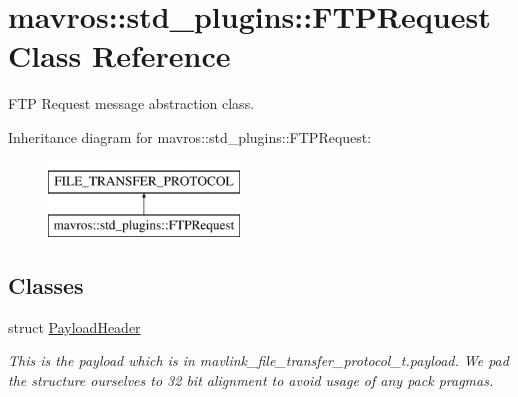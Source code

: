 \hypertarget{classmavros_1_1std__plugins_1_1FTPRequest}{}\section{mavros\+::std\+\_\+plugins\+::F\+T\+P\+Request Class Reference}
\label{classmavros_1_1std__plugins_1_1FTPRequest}


F\+TP Request message abstraction class.  


Inheritance diagram for mavros\+::std\+\_\+plugins\+::F\+T\+P\+Request\+:\begin{figure}[H]
\begin{center}
\leavevmode
\includegraphics[height=2.000000cm]{classmavros_1_1std__plugins_1_1FTPRequest}
\end{center}
\end{figure}
\subsection*{Classes}
\begin{DoxyCompactItemize}
\item 
struct \mbox{\hyperlink{structmavros_1_1std__plugins_1_1FTPRequest_1_1PayloadHeader}{Payload\+Header}}
\begin{DoxyCompactList}\small\item\em This is the payload which is in mavlink\+\_\+file\+\_\+transfer\+\_\+protocol\+\_\+t.\+payload. We pad the structure ourselves to 32 bit alignment to avoid usage of any pack pragmas. \end{DoxyCompactList}\end{DoxyCompactItemize}
